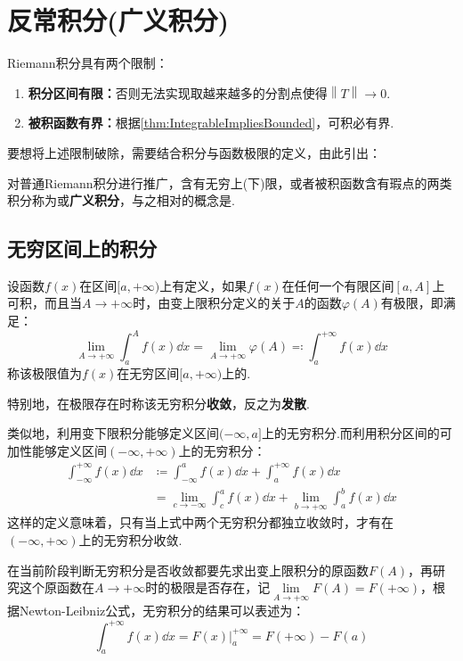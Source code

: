 \section{反常积分(广义积分)}
Riemann积分具有两个限制：
\begin{enumerate}[circ]
    \item \textbf{积分区间有限：}否则无法实现取越来越多的分割点使得$\left\|T\right\|\to 0$.
    \item \textbf{被积函数有界：}根据\cref{thm:IntegrableImpliesBounded}，可积必有界.
\end{enumerate}
要想将上述限制破除，需要结合积分与函数极限的定义，由此引出：
\begin{definition}
    对普通Riemann积分进行推广，含有无穷上(下)限，或者被积函数含有瑕点的两类积分称为或\textbf{广义积分}，与之相对的概念是.
\end{definition}

\subsection{无穷区间上的积分}
\begin{definition}
    设函数$f(x)$在区间$[a,+\infty)$上有定义，如果$f(x)$在任何一个有限区间$[a,A]$上可积，而且当$A\to+\infty$时，由变上限积分定义的关于$A$的函数$\varphi(A)$有极限，即满足：
    \[\lim_{A\to+\infty}\int_{a}^{A}f(x)\dd{x} = \lim_{A\to+\infty}\varphi(A) \eqcolon \int_{a}^{+\infty}f(x)\dd{x}\]
    称该极限值为$f(x)$在无穷区间$[a,+\infty)$上的.

    特别地，在极限存在时称该无穷积分\textbf{收敛}，反之为\textbf{发散}.
\end{definition}

类似地，利用变下限积分能够定义区间$(-\infty,a]$上的无穷积分.而利用积分区间的可加性能够定义区间$(-\infty,+\infty)$上的无穷积分：
\begin{align*}
    \int_{-\infty}^{+\infty}f(x)\dd{x} &\coloneq \int_{-\infty}^{a}f(x)\dd{x} + \int_{a}^{+\infty}f(x)\dd{x}\\
    &= \lim_{c\to -\infty}\int_{c}^{a}f(x)\dd{x} + \lim_{b\to +\infty}\int_{a}^{b}f(x)\dd{x}
\end{align*}
这样的定义意味着，只有当上式中两个无穷积分都独立收敛时，才有在$(-\infty,+\infty)$上的无穷积分收敛.

在当前阶段判断无穷积分是否收敛都要先求出变上限积分的原函数$F(A)$，再研究这个原函数在$A \to +\infty$时的极限是否存在，记$\lim\limits_{A \to +\infty} F(A) = F(+\infty)$，根据Newton-Leibniz公式，无穷积分的结果可以表述为：
\[\int_{a}^{+\infty}f(x)\dd{x} = F(x)\Big|_a^{+\infty} = F(+\infty) - F(a)\]

